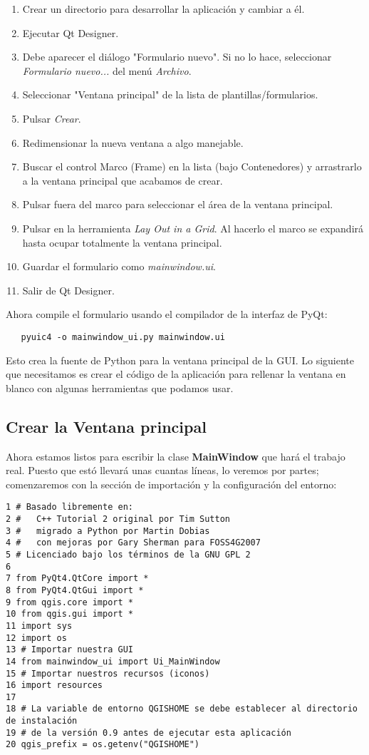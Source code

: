 \begin{enumerate}
\item Crear un directorio para desarrollar la aplicación y cambiar a él.
\item Ejecutar Qt Designer.
\item Debe aparecer el diálogo "Formulario nuevo". Si no lo hace, seleccionar 
\textsl{Formulario nuevo...} del menú \textsl{Archivo}.
\item Seleccionar "Ventana principal"  de la lista de plantillas/formularios.
\item Pulsar \textsl{Crear}.
\item Redimensionar la nueva ventana a algo manejable.
\item Buscar el control Marco (Frame) en la lista (bajo Contenedores) y arrastrarlo a la ventana principal
que acabamos de crear.
\item Pulsar fuera del marco para seleccionar el área de la ventana principal.
\item Pulsar en la herramienta \textsl{Lay Out in a Grid}. Al hacerlo el marco se expandirá hasta
ocupar totalmente la ventana principal.
\item Guardar el formulario como \textsl{mainwindow.ui}.
\item Salir de Qt Designer.
\end{enumerate} 

Ahora compile el formulario usando el compilador de la interfaz de PyQt:

\begin{verbatim}
   pyuic4 -o mainwindow_ui.py mainwindow.ui
\end{verbatim}

Esto crea la fuente de Python para la ventana principal de la GUI. Lo siguiente que necesitamos es crear
el código de la aplicación para rellenar la ventana en blanco con algunas herramientas que podamos usar.

\subsection{Crear la Ventana principal}

Ahora estamos listos para escribir la clase \textbf{MainWindow} que hará el trabajo real. Puesto que
estó llevará unas cuantas líneas, lo veremos por partes; comenzaremos con la sección de
importación y la configuración del entorno:

\begin{verbatim}
1 # Basado libremente en:
2 #   C++ Tutorial 2 original por Tim Sutton
3 #   migrado a Python por Martin Dobias
4 #   con mejoras por Gary Sherman para FOSS4G2007
5 # Licenciado bajo los términos de la GNU GPL 2
6
7 from PyQt4.QtCore import *
8 from PyQt4.QtGui import *
9 from qgis.core import *
10 from qgis.gui import *
11 import sys
12 import os
13 # Importar nuestra GUI
14 from mainwindow_ui import Ui_MainWindow
15 # Importar nuestros recursos (iconos)
16 import resources
17 
18 # La variable de entorno QGISHOME se debe establecer al directorio de instalación
19 # de la versión 0.9 antes de ejecutar esta aplicación
20 qgis_prefix = os.getenv("QGISHOME")
\end{verbatim}

